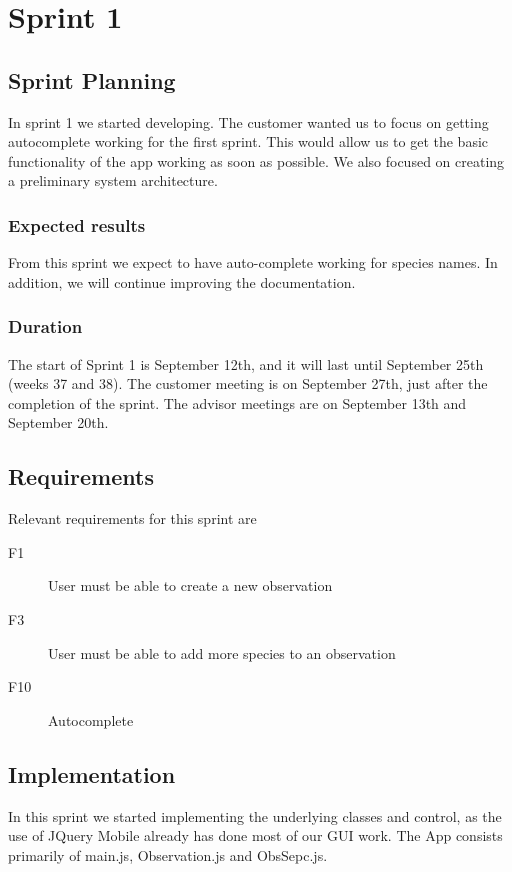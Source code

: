 \section{Sprint 1}

\subsection{Sprint Planning}

	In sprint 1 we started developing. The customer wanted us to focus on getting autocomplete working for the first sprint. This would allow us to get the basic functionality of the app working as soon as possible. We also focused on creating a preliminary system architecture.

\subsubsection{Expected results}
 From this sprint we expect to have auto-complete working for species names. In addition, we will continue improving the documentation.
	
\subsubsection{Duration}
The start of Sprint 1 is September 12th, and it will last until September 25th (weeks 37 and 38). The customer meeting is on September 27th, just after the completion of the sprint. The advisor meetings are on September 13th and September 20th.
	
\subsection{Requirements}

Relevant requirements for this sprint are 
\begin{description}
	\item[F1] User must be able to create a new observation 
	\item[F3] User must be able to add more species to an observation
	\item[F10] Autocomplete 
\end{description}

\subsection{Implementation}
In this sprint we started implementing the underlying classes and control, as the use of JQuery Mobile already has done most of our GUI work. The App consists primarily of main.js, Observation.js and ObsSepc.js.

